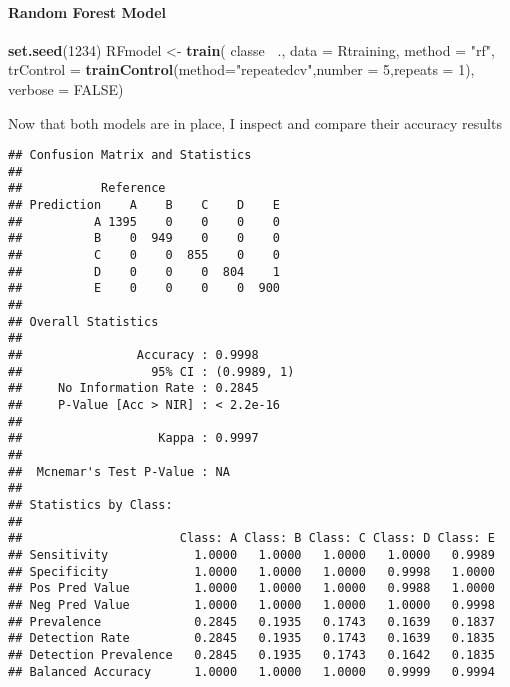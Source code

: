 \documentclass[]{article}
\newenvironment{Shaded}{\begin{snugshade}}{\end{snugshade}}
\newcommand{\DataTypeTok}[1]{\textcolor[rgb]{0.13,0.29,0.53}{#1}}
\newcommand{\DecValTok}[1]{\textcolor[rgb]{0.00,0.00,0.81}{#1}}
\newcommand{\KeywordTok}[1]{\textcolor[rgb]{0.13,0.29,0.53}{\textbf{#1}}}
\newcommand{\NormalTok}[1]{#1}
\newcommand{\OperatorTok}[1]{\textcolor[rgb]{0.81,0.36,0.00}{\textbf{#1}}}
\newcommand{\OtherTok}[1]{\textcolor[rgb]{0.56,0.35,0.01}{#1}}
\newcommand{\StringTok}[1]{\textcolor[rgb]{0.31,0.60,0.02}{#1}}
\let\oldparagraph\paragraph
\renewcommand{\paragraph}[1]{\oldparagraph{#1}\mbox{}}
\begin{document}
\hypertarget{random-forest-model}{%
\paragraph{Random Forest Model}\label{random-forest-model}}

\begin{Shaded}
\begin{Highlighting}[]
\KeywordTok{set.seed}\NormalTok{(}\DecValTok{1234}\NormalTok{)}
\NormalTok{RFmodel <-}\StringTok{ }\KeywordTok{train}\NormalTok{( classe }\OperatorTok{~}\NormalTok{., }\DataTypeTok{data =}\NormalTok{ Rtraining, }\DataTypeTok{method =} \StringTok{"rf"}\NormalTok{, }\DataTypeTok{trControl =} \KeywordTok{trainControl}\NormalTok{(}\DataTypeTok{method=}\StringTok{"repeatedcv"}\NormalTok{,}\DataTypeTok{number =} \DecValTok{5}\NormalTok{,}\DataTypeTok{repeats =} \DecValTok{1}\NormalTok{), }\DataTypeTok{verbose =} \OtherTok{FALSE}\NormalTok{)}
\end{Highlighting}
\end{Shaded}

Now that both models are in place, I inspect and compare their accuracy
results

\begin{Shaded}
\end{Shaded}

\begin{verbatim}
## Confusion Matrix and Statistics
## 
##           Reference
## Prediction    A    B    C    D    E
##          A 1395    0    0    0    0
##          B    0  949    0    0    0
##          C    0    0  855    0    0
##          D    0    0    0  804    1
##          E    0    0    0    0  900
## 
## Overall Statistics
##                                      
##                Accuracy : 0.9998     
##                  95% CI : (0.9989, 1)
##     No Information Rate : 0.2845     
##     P-Value [Acc > NIR] : < 2.2e-16  
##                                      
##                   Kappa : 0.9997     
##                                      
##  Mcnemar's Test P-Value : NA         
## 
## Statistics by Class:
## 
##                      Class: A Class: B Class: C Class: D Class: E
## Sensitivity            1.0000   1.0000   1.0000   1.0000   0.9989
## Specificity            1.0000   1.0000   1.0000   0.9998   1.0000
## Pos Pred Value         1.0000   1.0000   1.0000   0.9988   1.0000
## Neg Pred Value         1.0000   1.0000   1.0000   1.0000   0.9998
## Prevalence             0.2845   0.1935   0.1743   0.1639   0.1837
## Detection Rate         0.2845   0.1935   0.1743   0.1639   0.1835
## Detection Prevalence   0.2845   0.1935   0.1743   0.1642   0.1835
## Balanced Accuracy      1.0000   1.0000   1.0000   0.9999   0.9994
\end{verbatim}
\end{document}
